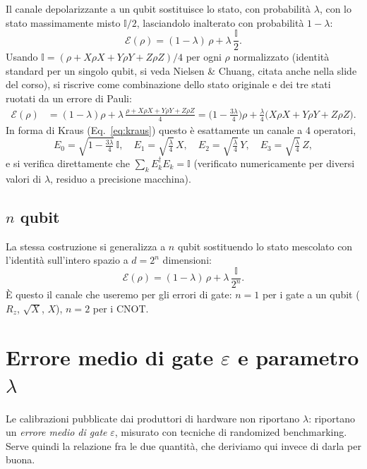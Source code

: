 \documentclass[11pt,a4paper]{article}
\begin{document}
Il canale depolarizzante a un qubit sostituisce lo stato, con probabilità $\lambda$,
con lo stato massimamente misto $\mathbb{I}/2$, lasciandolo inalterato con probabilità
$1-\lambda$:
\begin{equation}
\mathcal E(\rho) = (1-\lambda)\,\rho + \lambda\,\frac{\mathbb{I}}{2}.
\end{equation}
Usando $\mathbb{I} = (\rho+X\rho X+Y\rho Y+Z\rho Z)/4$ per ogni $\rho$ normalizzato
(identità standard per un singolo qubit, si veda Nielsen \& Chuang, citata anche nella
slide del corso), si riscrive come combinazione dello stato originale e dei tre stati
ruotati da un errore di Pauli:
\begin{align}
\mathcal E(\rho) &= (1-\lambda)\rho + \lambda\,\frac{\rho+X\rho X+Y\rho Y+Z\rho Z}{4}
= \Big(1-\tfrac{3\lambda}{4}\Big)\rho +
\frac{\lambda}{4}\big(X\rho X+Y\rho Y+Z\rho Z\big).
\end{align}
In forma di Kraus (Eq.~\eqref{eq:kraus}) questo è esattamente un canale a 4 operatori,
\begin{equation}
E_0=\sqrt{1-\tfrac{3\lambda}{4}}\,\mathbb{I},\quad
E_1=\sqrt{\tfrac{\lambda}{4}}\,X,\quad
E_2=\sqrt{\tfrac{\lambda}{4}}\,Y,\quad
E_3=\sqrt{\tfrac{\lambda}{4}}\,Z,
\label{eq:kraus-depol-1q}
\end{equation}
e si verifica direttamente che $\sum_k E_k^\dagger E_k=\mathbb{I}$ (verificato
numericamente per diversi valori di $\lambda$, residuo a precisione macchina).

\subsection{$n$ qubit}

La stessa costruzione si generalizza a $n$ qubit sostituendo lo stato mescolato con
l'identità sull'intero spazio a $d=2^n$ dimensioni:
\begin{equation}
\mathcal E(\rho) = (1-\lambda)\,\rho + \lambda\,\frac{\mathbb{I}}{2^n}.
\label{eq:depol-nqubit}
\end{equation}
È questo il canale che useremo per gli errori di gate: $n=1$ per i gate a un qubit
($R_z$, $\sqrt X$, $X$), $n=2$ per i CNOT.

\section{Errore medio di gate $\varepsilon$ e parametro $\lambda$}
\label{sec:eps-lambda}

Le calibrazioni pubblicate dai produttori di hardware non riportano $\lambda$: riportano
un \emph{errore medio di gate} $\varepsilon$, misurato con tecniche di randomized
benchmarking. Serve quindi la relazione fra le due quantità, che deriviamo qui invece
di darla per buona.
\end{document}

